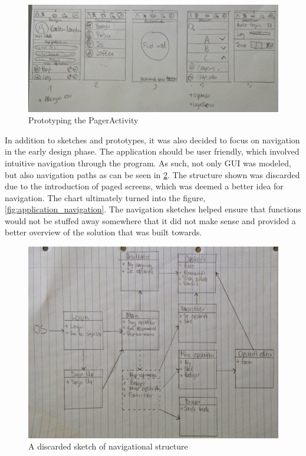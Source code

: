 \begin{figure}[H]
	\centering
	\includegraphics[width=\textwidth]{Pictures/prototype_pageractivity.jpg}
	\caption{Prototyping the PagerActivity}
	\label{fig:prototype_pageractivity}
\end{figure}

In addition to sketches and prototypes, it was also decided to focus on navigation in the early design phase. The application should be user friendly, which involved intuitive navigation through the program. As such, not only GUI was modeled, but also navigation paths as can be seen in \ref{fig:prototype_structure}. The structure shown was discarded due to the introduction of paged screens, which was deemed a better idea for navigation. The chart ultimately turned into the figure, \ref{fig:application_navigation}. The navigation sketches helped ensure that functions would not be stuffed away somewhere that it did not make sense and provided a better overview of the solution that was built towards.

\begin{figure}[H]
	\centering
	\includegraphics[width=\textwidth]{Pictures/prototype_structure.jpg}
	\caption{A discarded sketch of navigational structure}
	\label{fig:prototype_structure}
\end{figure}